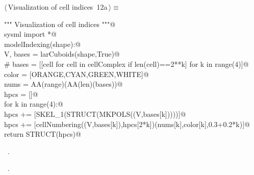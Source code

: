 \documentclass[11pt,oneside]{article}	%
\begin{document}
\begin{flushleft} \small \label{scrap22}
\protect{}$\langle\,$Visualization of cell indices\nobreak\ {\footnotesize 12a}$\,\rangle\equiv$
\vspace{-1ex}
\begin{list}{}{} \item
\mbox{}\verb@""" Visualization of cell indices """@\\
\mbox{}\verb@from sysml import *@\\
\mbox{}\verb@def modelIndexing(shape):@\\
\mbox{}\verb@   V, bases = larCuboids(shape,True)@\\
\mbox{}\verb@   # bases = [[cell for cell in cellComplex if len(cell)==2**k] for k in range(4)]@\\
\mbox{}\verb@   color = [ORANGE,CYAN,GREEN,WHITE]@\\
\mbox{}\verb@   nums = AA(range)(AA(len)(bases))@\\
\mbox{}\verb@   hpcs = []@\\
\mbox{}\verb@   for k in range(4):@\\
\mbox{}\verb@      hpcs += [SKEL_1(STRUCT(MKPOLS((V,bases[k]))))]@\\
\mbox{}\verb@      hpcs += [cellNumbering((V,bases[k]),hpcs[2*k])(nums[k],color[k],0.3+0.2*k)]@\\
\mbox{}\verb@   return STRUCT(hpcs)@\\
\mbox{}\verb@@{\NWsep}
\end{list}
\vspace{-1ex}
\footnotesize\addtolength{\baselineskip}{-1ex}
\begin{list}{}{\setlength{\itemsep}{-\parsep}\setlength{\itemindent}{-\leftmargin}}
\item \NWtxtMacroDefBy\ .
\item \NWtxtMacroRefIn\ .
\end{list}
\end{flushleft}
\end{document}
